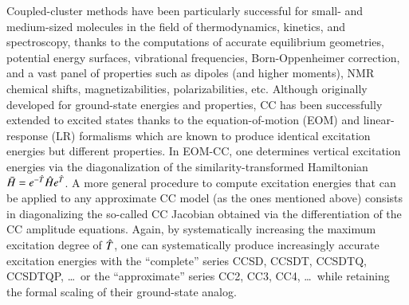 \documentclass[aip,jcp,reprint,noshowkeys,superscriptaddress]{revtex4-1}
\newcommand{\hH}{\Hat{H}}
\newcommand{\hT}{\Hat{T}}
\newcommand{\bH}{\Bar{H}}
\begin{document}
Coupled-cluster methods have been particularly successful for small- and medium-sized molecules in the field of thermodynamics, kinetics, and spectroscopy, thanks to the computations of accurate equilibrium geometries, \cite{Kallay_2003} potential energy surfaces, vibrational frequencies, \cite{Kallay_2004a} Born-Oppenheimer correction, \cite{Gauss_2006} and a vast panel of properties such as dipoles (and higher moments), \cite{Kallay_2003}  NMR chemical shifts, \cite{Kallay_2004a} magnetizabilities, \cite{Gauss_2009} polarizabilities, \cite{Kallay_2006} etc.
Although originally developed for ground-state energies and properties, CC has been successfully extended to excited states \cite{Monkhorst_1977} thanks to the equation-of-motion (EOM) \cite{Emrich_1981,Comeau_1993,Stanton_1993,Krylov_2008} and linear-response (LR) \cite{Ghosh_1981,Sekino_1984,Koch_1990a,Koch_1990b,Rico_1993} formalisms which are known to produce identical excitation energies but different properties.
In EOM-CC, one determines vertical excitation energies via the diagonalization of the similarity-transformed Hamiltonian $\bH = e^{-\hT} \hH e^{\hT}$.
A more general procedure to compute excitation energies that can be applied to any approximate CC model (as the ones mentioned above) consists in diagonalizing the so-called CC Jacobian obtained via the differentiation of the CC amplitude equations.
Again, by systematically increasing the maximum excitation degree of $\hT$, one can systematically produce increasingly accurate excitation energies with the ``complete'' series CCSD, \cite{Stanton_1993} CCSDT, \cite{Kowalski_2001,Kucharski_2001} CCSDTQ, \cite{Hirata_2004} CCSDTQP, \cite{Kallay_2004b} \ldots~or the ``approximate'' series CC2, \cite{Christiansen_1995a} CC3, \cite{Christiansen_1995b} CC4, \cite{Kallay_2004b} \ldots~while retaining the formal scaling of their ground-state analog.
\end{document}
